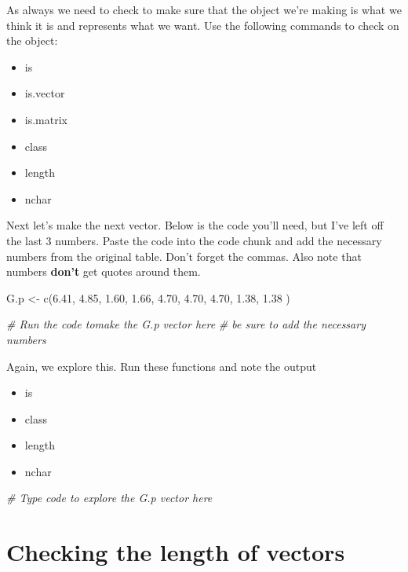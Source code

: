\documentclass[
]{book}
\newenvironment{Shaded}{\begin{snugshade}}{\end{snugshade}}
\newcommand{\CommentTok}[1]{\textcolor[rgb]{0.56,0.35,0.01}{\textit{#1}}}
\providecommand{\tightlist}{%
  \setlength{\itemsep}{0pt}\setlength{\parskip}{0pt}}
\begin{document}
As always we need to check to make sure that the object we're making is what we think it is and represents what we want. Use the following commands to check on the object:

\begin{itemize}
\tightlist
\item
  is
\item
  is.vector
\item
  is.matrix
\item
  class
\item
  length
\item
  nchar
\end{itemize}

Next let's make the next vector. Below is the code you'll need, but I've left off the last 3 numbers. Paste the code into the code chunk and add the necessary numbers from the original table. Don't forget the commas. Also note that numbers \textbf{don't} get quotes around them.

G.p \textless- c(6.41, 4.85, 1.60, 1.66, 4.70, 4.70, 4.70, 1.38, 1.38 )

\begin{Shaded}
\begin{Highlighting}[]
\CommentTok{\# Run the code tomake the G.p vector here}
\CommentTok{\# be sure to add the necessary numbers}
\end{Highlighting}
\end{Shaded}

Again, we explore this. Run these functions and note the output

\begin{itemize}
\tightlist
\item
  is
\item
  class
\item
  length
\item
  nchar
\end{itemize}

\begin{Shaded}
\begin{Highlighting}[]
\CommentTok{\# Type code to explore the G.p vector here}
\end{Highlighting}
\end{Shaded}

\hypertarget{checking-the-length-of-vectors-1}{%
\section{Checking the length of vectors}\label{checking-the-length-of-vectors-1}}
\end{document}
